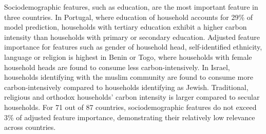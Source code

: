 \documentclass[12pt, a4paper]{article}
\begin{document}
Sociodemographic features, such as education, are the most important feature in three countries. In Portugal, where education of household accounts for 29\% of model prediction, households with tertiary education exhibit a higher carbon intensity than households with primary or secondary education. Adjusted feature importance for features such as gender of household head, self-identified ethnicity, language or religion is highest in Benin or Togo, where households with female household heads are found to consume less carbon-intensively. In Israel, households identifying with the muslim community are found to consume more carbon-intensively compared to households identifying as Jewish. Traditional, religious and orthodox households' carbon intensity is larger compared to secular households. For 71 out of 87 countries, sociodemographic features do not exceed 3\% of adjusted feature importance, demonstrating their relatively low relevance across countries.
\end{document}
